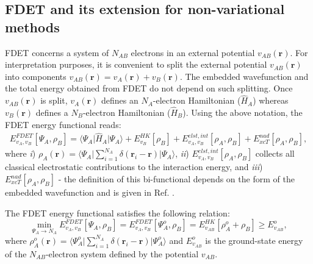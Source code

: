 \documentclass[amsmath,amssymb,preprint,aip,jcp]{revtex4-1}
\begin{document}
\subsection{FDET and its extension for non-variational methods}
FDET concerns a system of $N_{AB}$ electrons in an external potential $v_{AB}(\mathbf{r})$.
For interpretation purposes, it is convenient to split the external potential $v_{AB}(\mathbf{r})$ into components $v_{AB}(\mathbf{r})=v_{A}(\mathbf{r})+v_{B}(\mathbf{r})$. 
The embedded wavefunction and the total energy obtained from FDET do not depend on such splitting. 
Once $v_{AB}(\mathbf{r})$ is split, $v_{A}(\mathbf{r})$ defines an $N_A$-electron Hamiltonian ($\hat{H}_A$) whereas 
$v_{B}(\mathbf{r})$ defines a $N_B$-electron Hamiltonian ($\hat{H}_B$). 
Using the above notation, the FDET energy functional reads: 
\begin{eqnarray} 
\label{eq:E_FDET_v'}
{E}_{v_A,v_B}^{FDET}[\Psi_{A},\rho_B] = \langle\Psi_{A}\vert \hat{H}_A\vert \Psi_{A}\rangle + E^{HK}_{v_B}[\rho_B] + E^{elst,int}_{v_A,v_B}[\rho_A,\rho_B] + E_{xcT}^{nad}[\rho_A,\rho_B], 
\end{eqnarray}
where {\it i}) $\rho_A(\mathbf{r})=\langle\Psi_A\vert\sum_{i=1}^{N_{A}}\delta(\mathbf{r}_i-\mathbf{r})\vert\Psi_A\rangle$,
{\it ii}) $E^{elst,int}_{v_A,v_B}[\rho_A,\rho_B]$ collects all classical electrostatic contributions to the interaction energy, and 
{\it iii}) $E_{xcT}^{nad}[\rho_A,\rho_B]$ - the definition of this bi-functional depends on the form of the embedded wavefunction and is given in Ref. .

The FDET energy functional satisfies the following relation:
\begin{equation}\label{eq:nfund}
\min_{\Psi_A\rightarrow N_A} E_{v_{A},{v_B}}^{FDET}[\Psi_{A},\rho_B] = E_{v_{A},{v_B}}^{FDET}[\Psi^{o}_{A},\rho_B] = E_{v_{AB}}^{HK}[\rho_A^{o}+\rho_B] \ge E_{v_{AB}}^o,
\end{equation}
where $\rho_A^{{o}}(\mathbf{r})=\langle\Psi_A^{{o}}\vert\sum_{i=1}^{N_{A}}\delta(\mathbf{r}_i-\mathbf{r})\vert\Psi_A^{{o}}\rangle$ 
and $E_{v_{AB}}^o$ is the ground-state energy of the $N_{AB}$-electron system defined by the potential $v_{AB}$.
\end{document}
